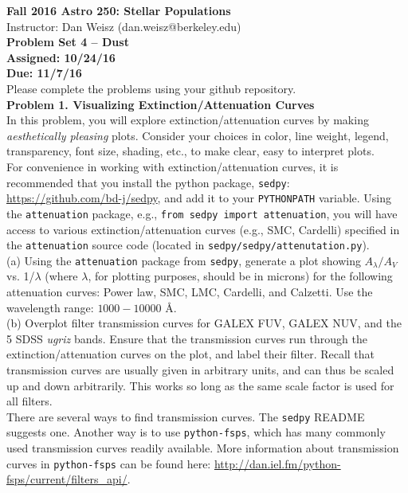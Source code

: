 \documentclass{article}
\begin{document}
\noindent \textbf{\large{Fall 2016 Astro 250: Stellar Populations}} \\
\noindent Instructor: Dan Weisz (dan.weisz@berkeley.edu) \\
\textbf{\large{Problem Set 4 -- Dust}} \\
\textbf{{Assigned: 10/24/16}} \\
\textbf{{Due: 11/7/16}} \\

Please complete the problems using your github repository. \\


\noindent \textbf{Problem 1. Visualizing Extinction/Attenuation Curves} \\ 


In this problem, you will explore extinction/attenuation curves by making \textit{aesthetically pleasing} plots.  Consider your choices in color, line weight, legend, transparency, font size, shading, etc., to make clear, easy to interpret plots. \\

For convenience in working with extinction/attenuation curves, it is recommended that you install the  python package, \texttt{sedpy}: \url{https://github.com/bd-j/sedpy}, and add it to your \texttt{PYTHONPATH} variable.  Using the \texttt{attenuation} package, e.g., \texttt{from sedpy import attenuation}, you will have access to various extinction/attenuation curves (e.g., SMC, Cardelli) specified in the \texttt{attenuation} source code (located in \texttt{sedpy/sedpy/attenutation.py}). \\

(a) Using the \texttt{attenuation} package from \texttt{sedpy}, generate a plot showing $A_\lambda / A_V$ vs. 1/$\lambda$ (where $\lambda$, for plotting purposes, should be in microns) for the following attenuation curves: Power law, SMC, LMC, Cardelli, and Calzetti.  Use the wavelength range: $1000-10000$ \AA. \\

(b) Overplot filter transmission curves for GALEX FUV, GALEX NUV, and the 5 SDSS \textit{ugriz} bands.  Ensure that the transmission curves run through the extinction/attenuation curves on the plot, and label their filter.  Recall that transmission curves are usually given in arbitrary units, and can thus be scaled up and down arbitrarily.  This works so long as the same scale factor is used for all filters. \\

There are several ways to find transmission curves.  The \texttt{sedpy} README suggests one.  Another way is to use \texttt{python-fsps}, which has many commonly used transmission curves readily available.  More information about transmission curves in \texttt{python-fsps} can be found here: \url{http://dan.iel.fm/python-fsps/current/filters_api/}. \\
\end{document}
